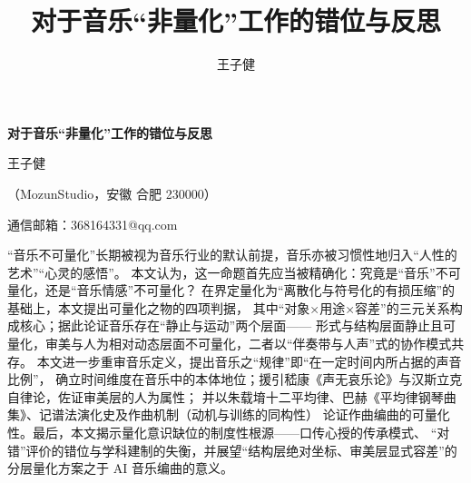 \documentclass[11pt,a4paper,fontset=none]{ctexart}
\title{对于音乐“非量化”工作的错位与反思}
\author{王子健}
\date{}
\begin{document}
\thispagestyle{empty}

\begin{center}
  {\sffamily\bfseries\fontsize{17}{21}\selectfont
   对于音乐“非量化”工作的错位与反思\par}
  \vspace{0.9em}
  {\normalsize 王子健\par}
  \vspace{0.35em}
  {\small（MozunStudio，安徽 合肥 230000）\par}
  \vspace{0.25em}
  {\small 通信邮箱：368164331@qq.com\par}
\end{center}
\vspace{0.4em}

\begin{摘要}
“音乐不可量化”长期被视为音乐行业的默认前提，音乐亦被习惯性地归入“人性的艺术”“心灵的感悟”。
本文认为，这一命题首先应当被精确化：究竟是“音乐”不可量化，还是“音乐情感”不可量化？
在界定量化为“离散化与符号化的有损压缩”的基础上，本文提出可量化之物的四项判据，
其中“对象×用途×容差”的三元关系构成核心；据此论证音乐存在“静止与运动”两个层面——
形式与结构层面静止且可量化，审美与人为相对动态层面不可量化，二者以“伴奏带与人声”式的协作模式共存。
本文进一步重审音乐定义，提出音乐之“规律”即“在一定时间内所占据的声音比例”，
确立时间维度在音乐中的本体地位；援引嵇康《声无哀乐论》与汉斯立克自律论，佐证审美层的人为属性；
并以朱载堉十二平均律、巴赫《平均律钢琴曲集》、记谱法演化史及作曲机制（动机与训练的同构性）
论证作曲编曲的可量化性。最后，本文揭示量化意识缺位的制度性根源——口传心授的传承模式、
“对错”评价的错位与学科建制的失衡，并展望“结构层绝对坐标、审美层显式容差”的
分层量化方案之于 AI 音乐编曲的意义。
\end{摘要}



\end{document}
